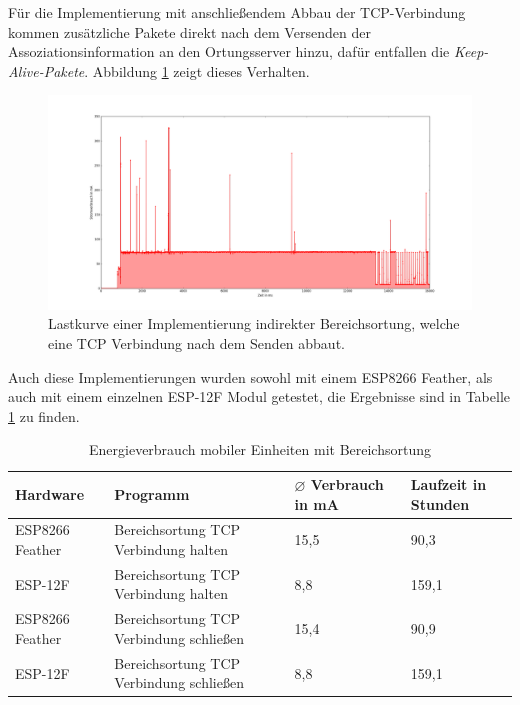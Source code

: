Für die Implementierung mit anschließendem Abbau der TCP-Verbindung kommen zusätzliche Pakete direkt nach dem Versenden der Assoziationsinformation an den Ortungsserver hinzu, dafür entfallen die \emph{Keep-Alive-Pakete}.
Abbildung \ref{fig:tcpdisco} zeigt dieses Verhalten.\\

\begin{figure}[h!]
  \centering
	\includegraphics[width=\textwidth]{plots/tcpdisco.png}
  \caption{Lastkurve einer Implementierung indirekter Bereichsortung, welche eine TCP Verbindung nach dem Senden abbaut.}
  \label{fig:tcpdisco}
\end{figure}

Auch diese Implementierungen wurden sowohl mit einem ESP8266 Feather, als auch mit einem einzelnen ESP-12F Modul getestet, die Ergebnisse sind in Tabelle \ref{table:associatonina} zu finden.

\begin{table}[h!]
	\centering
	\caption{Energieverbrauch mobiler Einheiten mit Bereichsortung}
	\label{table:associatonina}
	\begin{tabular}{p{3.5cm}|p{5cm}|p{2.5cm}|p{2.5cm}}
		Hardware & Programm & $\varnothing$ Verbrauch in mA & Laufzeit in Stunden\\
		\hline
		ESP8266 Feather & Bereichsortung TCP Verbindung halten & 15,5 & 90,3\\
		ESP-12F & Bereichsortung TCP Verbindung halten & 8,8 & 159,1\\
		ESP8266 Feather & Bereichsortung TCP Verbindung schließen & 15,4 & 90,9\\
		ESP-12F & Bereichsortung TCP Verbindung schließen & 8,8 & 159,1\\
	\end{tabular}
\end{table}

